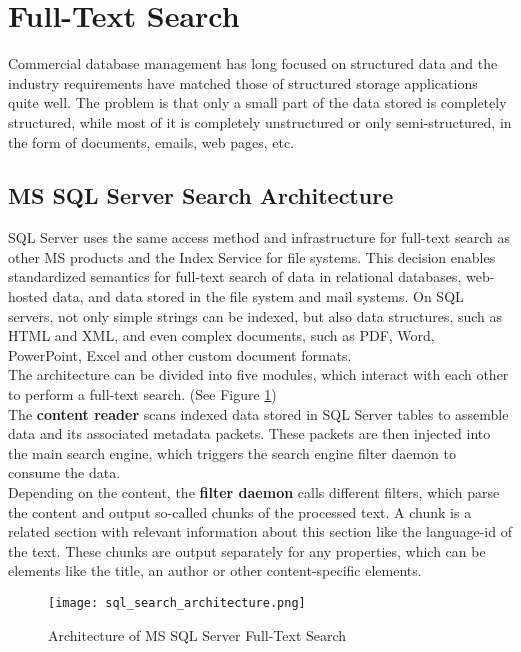 \section{Full-Text Search}
Commercial database management has long focused on structured data and the industry requirements have matched those of structured storage applications quite well.
The problem is that only a small part of the data stored is completely structured, while most of it is completely unstructured or only semi-structured, in the form of documents, emails, web pages, etc. \parencite[cf.][p. 7]{hamilton_microsoft_2001}\\
\subsection{MS SQL Server Search Architecture}
\ac{SQL} Server uses the same access method and infrastructure for full-text search as other \ac{MS} products and the Index Service for file systems. This decision enables standardized semantics for full-text search of data in relational databases, web-hosted data, and data stored in the file system and mail systems. On \ac{SQL} servers, not only simple strings can be indexed, but also data structures, such as \ac{HTML} and \ac{XML}, and even complex documents, such as \ac{PDF}, Word, PowerPoint, Excel and other custom document formats. \parencite[cf.][p. 7]{hamilton_microsoft_2001}\\
The architecture can be divided into five modules, which interact with each other to perform a full-text search. (See Figure \ref{fig:sql_search_architecture})\\
The \textbf{content reader} scans indexed data stored in \ac{SQL} Server tables to assemble data and its associated metadata packets. These packets are then injected into the main search engine, which triggers the search engine filter daemon to consume the data.\\
Depending on the content, the \textbf{filter daemon} calls different filters, which parse the content and output so-called chunks of the processed text. A chunk is a related section with relevant information about this section like the language-id of the text. These chunks are output separately for any properties, which can be elements like the title, an author or other content-specific elements.
\begin{figure}[H]
    \caption{Architecture of MS SQL Server Full-Text Search}
    \label{fig:sql_search_architecture}
    \texttt{[image: sql\_search\_architecture.png]}
    \\
    \cite[Source:][p. 8]{hamilton_microsoft_2001}
\end{figure}
